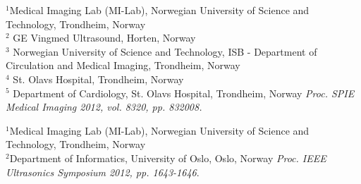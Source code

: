 \documentclass[10pt,b5paper,twoside]{book}
\begin{document}
\begin{bibunit}[IEEEtran]
{
$^{1}$Medical Imaging Lab (MI-Lab), Norwegian University of Science and Technology, Trondheim, Norway\\
$^{2}$ GE Vingmed Ultrasound, Horten, Norway\\
$^{3}$ Norwegian University of Science and Technology, ISB - Department of Circulation and Medical Imaging, Trondheim, Norway\\
$^{4}$ St. Olavs Hospital, Trondheim, Norway\\
$^{5}$ Department of Cardiology, St. Olavs Hospital, Trondheim, Norway
}
\noindent \textit{Proc. SPIE Medical Imaging 2012, vol. 8320, pp. 832008.}
\newpage
\newpage{}
\end{bibunit}

\begin{bibunit}[IEEEtran]
{
	$^{1}$Medical Imaging Lab (MI-Lab), Norwegian University of Science and Technology, Trondheim, Norway\\
    	$^{2}$Department of Informatics, University of Oslo, Oslo, Norway
}
\noindent \textit{Proc. IEEE Ultrasonics Symposium 2012, pp. 1643-1646}.
\newpage
\newpage{}
\end{bibunit}

\end{document}
